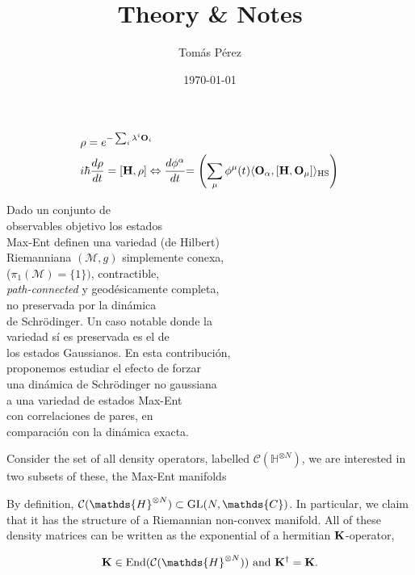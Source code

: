\documentclass{homework}
\author{Tomás Pérez}
\date{\today}
\title{Theory \& Notes}
\begin{document}
 \maketitle

\iffalse
\begin{align*}
    &\rho = e^{-\sum_{i}
    \lambda^i {\bf O}_i} \\
    &i\hbar \frac{d\rho}{dt} = [{\bf H}, \rho] \Leftrightarrow  {\frac{d\phi^{\alpha}}{dt}}{= \left(\sum_{\mu} \phi^\mu(t) \langle{\bf O}_\alpha, [{\bf H}, {\bf O}_{\mu}]\rangle_{\textnormal{HS}}\right)}
\end{align*}

Dado un conjunto de \\ observables objetivo los estados \\ Max-Ent 
definen una variedad (de Hilbert) \\ Riemanniana $(\mathcal{M}, g)$ simplemente conexa, \\ ($\pi_1(\mathcal{M} )= \{1\})$, contractible, \\ \textit{path-connected} y geodésicamente completa,\\  no preservada por la dinámica \\ de Schr\"odinger. 
Un caso notable donde la \\ variedad sí es preservada es el de \\ los estados Gaussianos. 
En esta contribución, \\ proponemos estudiar el efecto de forzar \\ una dinámica de Schr\"odinger
no gaussiana \\ a una variedad  de estados Max-Ent \\ con  correlaciones de pares, 
en \\ comparación con la dinámica exacta.

Consider the set of all density operators, labelled $\mathcal{C}(\mathds{H}^{\otimes N})$, we are interested in two subsets of these, the Max-Ent manifolds




By definition, $\mathcal{C}(\mathds{H}^{\otimes N}) \subset \textnormal{GL}(N, \mathds{C})$. In particular, we claim that it has the structure of a Riemannian non-convex manifold. All of these density matrices can be written as the exponential of a hermitian ${\bf K}$-operator,

$$
    {\bf K} \in \textnormal{End}(\mathcal{C}(\mathds{H}^{\otimes N})) \textnormal{  and  } {\bf K}^\dagger = {\bf K}.
$$
\end{document}

